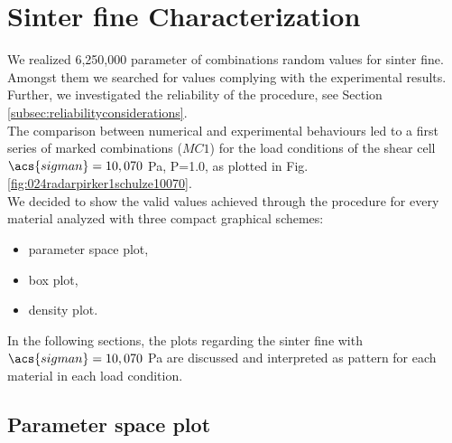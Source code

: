 \section{Sinter fine Characterization}
\label{sec:sinterfinecharacterization}

We realized 6,250,000 parameter of combinations random values for sinter fine.
Amongst them we searched for values complying with the experimental results.
Further, we investigated the reliability of the procedure, see Section
\ref{subsec:reliabilityconsiderations}.\\
The comparison between numerical and experimental behaviours led to a first
series of marked combinations ($MC1$) for the load conditions of
the shear cell $\acs{sigman} = 10,070$ Pa, P=1.0, as plotted in Fig.
\ref{fig:024radarpirker1schulze10070}.\\
We decided to show the valid values achieved through the procedure for every
material analyzed with three compact graphical schemes:

\begin{itemize}
  \item{parameter space plot,}
  \item{box plot,}
  \item{density plot.}
\end{itemize}

In the following sections, the plots regarding the sinter fine with
$\acs{sigman} = 10,070$ Pa are discussed and interpreted as pattern for each
material in each load condition.

\subsection{Parameter space plot}
\label{subsec:parameterspaceplot}


